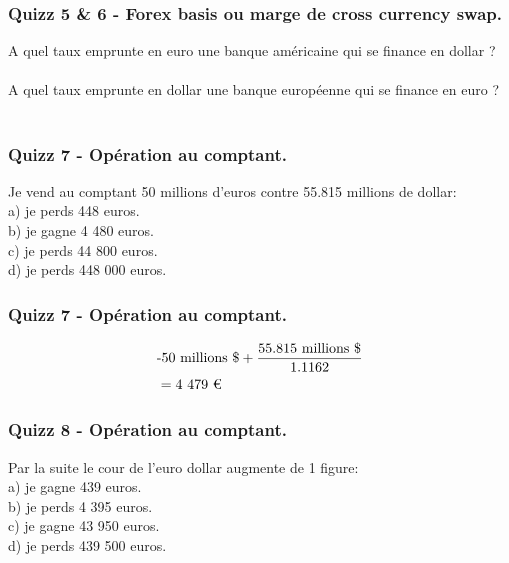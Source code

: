 \documentclass{beamer}
\begin{document}
\begin{frame}
\frametitle{Quizz 5 \& 6 - Forex basis ou marge de cross currency swap.}
A quel taux emprunte en euro une banque américaine qui se finance en dollar ?\\
\center {}\\
\vspace{0.5cm}
A quel taux emprunte en dollar une banque européenne qui se finance en euro ?\\  
\center {}\\
\end{frame}



\begin{frame}
\frametitle{Quizz 7 - Opération au comptant.}
Je vend au comptant 50 millions d'euros contre 55.815 millions de dollar: \\
\vspace{0.5cm}
a) je perds 448 euros. \\
b) je gagne 4 480 euros.  \\
c) je perds 44 800 euros. \\
d) je perds 448 000 euros.  \\
\vspace{0.5cm}
\end{frame}

\begin{frame}
\frametitle{Quizz 7 - Opération au comptant.}
\huge
\[
\begin{split}
&\text{-50 millions \$}+\frac{\text{55.815 millions \$}}{1.1162}\\
&=\text{4 479 \texteuro}\\
\end{split}
\]
\end{frame}


\begin{frame}
\frametitle{Quizz 8 - Opération au comptant.}
Par la suite le cour de l'euro dollar augmente de 1 figure: \\
\vspace{0.5cm}
a) je gagne 439 euros. \\
b) je perds 4 395 euros.  \\
c) je gagne 43 950 euros. \\
d) je perds 439 500 euros.  \\
\vspace{0.5cm}
\end{frame}
\end{document}
